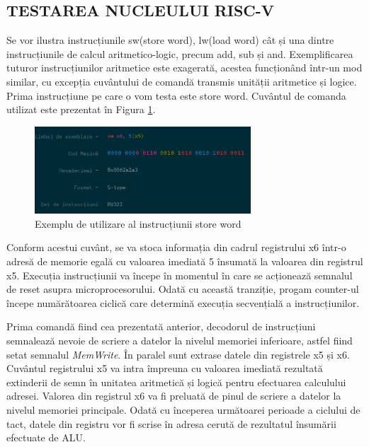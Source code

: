 \documentclass[12pt]{article}
\begin{document}
\subsection{TESTAREA NUCLEULUI RISC-V}
Se vor ilustra instrucțiunile sw(store word), lw(load word) cât și una dintre instrucțiunile de calcul aritmetico-logic, precum add, sub și and. Exemplificarea tuturor instrucțiunilor aritmetice este exagerată, acestea funcționând într-un mod similar, cu excepția cuvântului de comandă transmis unității aritmetice și logice. Prima instrucțiune pe care o vom testa este store word. Cuvântul de comanda utilizat este prezentat în Figura \ref{Figura:65}.

  \begin{figure}[h!]
 \hspace*{-0.1cm}\includegraphics[width=0.72\textwidth]{swtype.png}
 \centering
 \caption{Exemplu de utilizare al instrucțiunii store word}
 \label{Figura:65}
 \end{figure}
 
Conform acestui cuvânt, se va stoca informația din cadrul registrului x6 într-o adresă de memorie egală cu valoarea imediată 5 însumată la valoarea din registrul x5. Execuția instrucțiunii va începe în momentul în care se acționează semnalul de reset asupra microprocesorului. Odată cu această tranziție, progam counter-ul începe numărătoarea ciclică care determină execuția secvențială a instrucțiunilor.

Prima comandă fiind cea prezentată anterior, decodorul de instrucțiuni semnalează nevoie de scriere a datelor la nivelul memoriei inferioare, astfel fiind setat semnalul \textit{MemWrite}. În paralel sunt extrase datele din registrele x5 și x6. Cuvântul registrului x5 va intra împreuna cu valoarea imediată rezultată extinderii de semn în unitatea aritmetică și logică pentru efectuarea calculului adresei. Valorea din registrul x6 va fi preluată de pinul de scriere a datelor la nivelul memoriei principale. 
Odată cu începerea următoarei perioade a ciclului de tact, datele din registru vor fi scrise în adresa cerută de rezultatul însumării efectuate de ALU.
 
\end{document}
